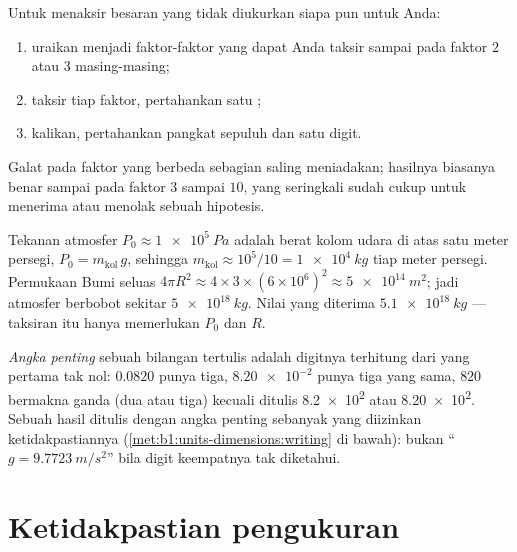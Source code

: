 \begin{method}[Menaksir]\label{met:b1:units-dimensions:estimate}
Untuk menaksir besaran yang tidak diukurkan siapa pun untuk Anda:
\begin{enumerate}
  \item uraikan menjadi faktor-faktor yang dapat Anda taksir sampai
        pada faktor $2$ atau $3$ masing-masing;
  \item taksir tiap faktor, pertahankan satu ;
  \item kalikan, pertahankan pangkat sepuluh dan satu digit.
\end{enumerate}
Galat pada faktor yang berbeda sebagian saling meniadakan; hasilnya
biasanya benar sampai pada faktor $3$ sampai $10$, yang seringkali
sudah cukup untuk menerima atau menolak sebuah hipotesis.
\end{method}

\begin{example}\label{ex:b1:units-dimensions:atmosphere}
Tekanan atmosfer $P_0 \approx \qty{1e5}{Pa}$ adalah berat kolom udara
di atas satu meter persegi, $P_0 = m_{\text{kol}}\,g$, sehingga
$m_{\text{kol}} \approx 10^5/10 = \qty{1e4}{kg}$ tiap meter persegi.
Permukaan Bumi seluas $4\pi R^2 \approx 4 \times 3 \times (6\times10^6)^2
\approx \qty{5e14}{m^2}$; jadi atmosfer berbobot sekitar
$\qty{5e18}{kg}$. Nilai yang diterima $\qty{5.1e18}{kg}$ --- taksiran
itu hanya memerlukan $P_0$ dan $R$.
\end{example}

\begin{definition}\label{def:b1:units-dimensions:sigfig}
\emph{Angka penting} sebuah bilangan tertulis adalah digitnya terhitung
dari yang pertama tak nol: $0.0820$ punya tiga, $\num{8.20e-2}$ punya
tiga yang sama, $820$ bermakna ganda (dua atau tiga) kecuali ditulis
\num{8.2e2} atau \num{8.20e2}. Sebuah hasil ditulis dengan angka
penting sebanyak yang diizinkan ketidakpastiannya
(\cref{met:b1:units-dimensions:writing} di bawah): bukan
``$g = \qty{9.7723}{m/s^2}$'' bila digit keempatnya tak diketahui.
\end{definition}

\section{Ketidakpastian pengukuran}

